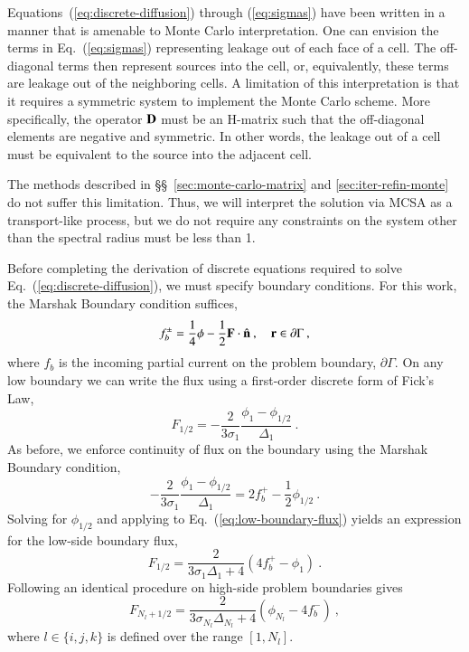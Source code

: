 \documentclass[preprint,12pt]{elsarticle}
\newcommand{\vr}{\ensuremath{\ve{r}}}
\begin{document}
Equations~(\ref{eq:discrete-diffusion}) through (\ref{eq:sigmas}) have been
written in a manner that is amenable to Monte Carlo interpretation.  One can
envision the terms in Eq.~(\ref{eq:sigmas}) representing leakage out of each
face of a cell.  The off-diagonal terms then represent sources into the cell,
or, equivalently, these terms are leakage out of the neighboring cells.  A
limitation of this interpretation is that it requires a symmetric system to
implement the Monte Carlo scheme.  More specifically, the operator $\mathbf{D}$
must be an H-matrix \cite{kelley_1995} such that the off-diagonal elements are
negative and symmetric.  In other words, the leakage out of a cell must be
equivalent to the source into the adjacent cell.

The methods described in \S\S~\ref{sec:monte-carlo-matrix} and
\ref{sec:iter-refin-monte} do not suffer this limitation.  Thus, we will
interpret the solution via MCSA as a transport-like process, but we do not
require any constraints on the system other than the spectral radius must be
less than 1.

Before completing the derivation of discrete equations required to solve
Eq.~(\ref{eq:discrete-diffusion}), we must specify boundary conditions.  For
this work, the Marshak Boundary condition suffices,
\begin{equation}
  f_b^\pm = \frac{1}{4}\phi -
  \frac{1}{2}\ve{F}\cdot\hat{\ve{n}}\:,\quad \vr\in \partial\Gamma\:,
\end{equation}
where $f_b$ is the incoming partial current on the problem boundary,
$\partial\Gamma$.  On any low boundary we can write the flux using a
first-order discrete form of Fick's Law,
\begin{equation}
  F_{1/2} = -\frac{2}{3\sigma_1}\frac{\phi_1 -
    \phi_{1/2}}{\Delta_1}\:.
  \label{eq:low-boundary-flux}
\end{equation}
As before, we enforce continuity of flux on the boundary using the
Marshak Boundary condition,
\begin{equation}
  -\frac{2}{3\sigma_1}\frac{\phi_1 - \phi_{1/2}}{\Delta_1} = 2f_b^{+}
  -\frac{1}{2}\phi_{1/2}\:.
\end{equation}
Solving for $\phi_{1/2}$ and applying to Eq.~(\ref{eq:low-boundary-flux})
yields an expression for the low-side boundary flux,
\begin{equation}
  F_{1/2} = \frac{2}{3\sigma_1\Delta_1 + 4}(4f_b^{+}-\phi_1)\:.
\end{equation}
Following an identical procedure on high-side problem boundaries gives
\begin{equation}
  F_{N_l+1/2} = \frac{2}{3\sigma_{N_l}\Delta_{N_l} +
    4}(\phi_{N_l}-4f_b^{-})\:,
\end{equation}
where $l\in\{i,j,k\}$ is defined over the range $[1,N_l]$.
\end{document}
